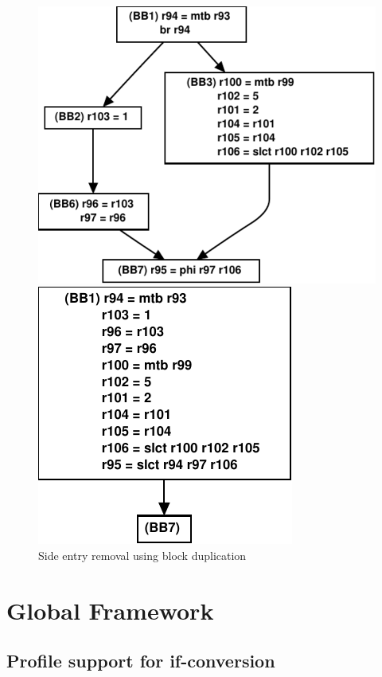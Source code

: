\begin{figure}[th]
\begin{minipage}[b]{3cm}
\includegraphics[scale=0.3]{g3.pdf}
\end{minipage}
\begin{minipage}[b]{3cm}
\includegraphics[scale=0.3]{g4.pdf}
\end{minipage}
\caption{Side entry removal using block duplication}
\label{fig:bbdup}
\end{figure}

\section{Global Framework}

\subsection{Profile support for if-conversion}

